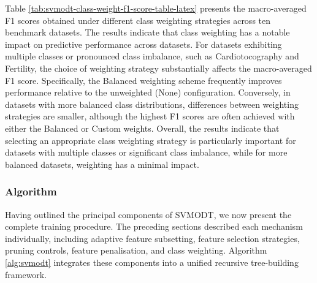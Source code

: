Table \ref{tab:svmodt-class-weight-f1-score-table-latex} presents the macro-averaged F1 scores obtained under different class weighting strategies across ten benchmark datasets. The results indicate that class weighting has a notable impact on predictive performance across datasets. For datasets exhibiting multiple classes or pronounced class imbalance, such as Cardiotocography and Fertility, the choice of weighting strategy substantially affects the macro-averaged F1 score. Specifically, the Balanced weighting scheme frequently improves performance relative to the unweighted (None) configuration. Conversely, in datasets with more balanced class distributions, differences between weighting strategies are smaller, although the highest F1 scores are often achieved with either the Balanced or Custom weights. Overall, the results indicate that selecting an appropriate class weighting strategy is particularly important for datasets with multiple classes or significant class imbalance, while for more balanced datasets, weighting has a minimal impact.

\subsubsection{Algorithm}\label{algorithm}

Having outlined the principal components of SVMODT, we now present the complete training procedure. The preceding sections described each mechanism individually, including adaptive feature subsetting, feature selection strategies, pruning controls, feature penalisation, and class weighting. Algorithm \ref{alg:svmodt} integrates these components into a unified recursive tree-building framework.

